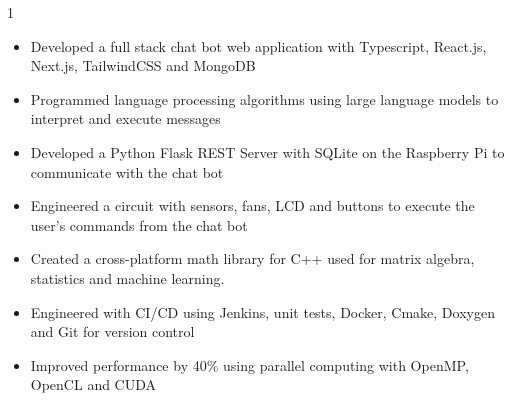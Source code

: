 \documentclass[11pt,a4paper,ragged2e]{altacv}
\begin{document}
\begin{paracol}{1}
\begin{itemize}
  \item Developed a full stack chat bot web application with Typescript, React.js, Next.js, TailwindCSS and MongoDB
  \item Programmed language processing algorithms using large language models to interpret and execute messages 
  \item Developed a Python Flask REST Server with SQLite on the Raspberry Pi to communicate with the chat bot
  \item Engineered a circuit with sensors, fans, LCD and buttons to execute the user's commands from the chat bot 
  \end{itemize}

  \medskip





\begin{itemize}
\item Created a cross-platform math library for C++ used for matrix algebra, statistics and machine learning.
\item Engineered with CI/CD using Jenkins, unit tests, Docker, Cmake, Doxygen and Git for version control
\item Improved performance by 40\% using parallel computing with OpenMP, OpenCL and CUDA
\end{itemize}


\end{paracol}
\end{document}
